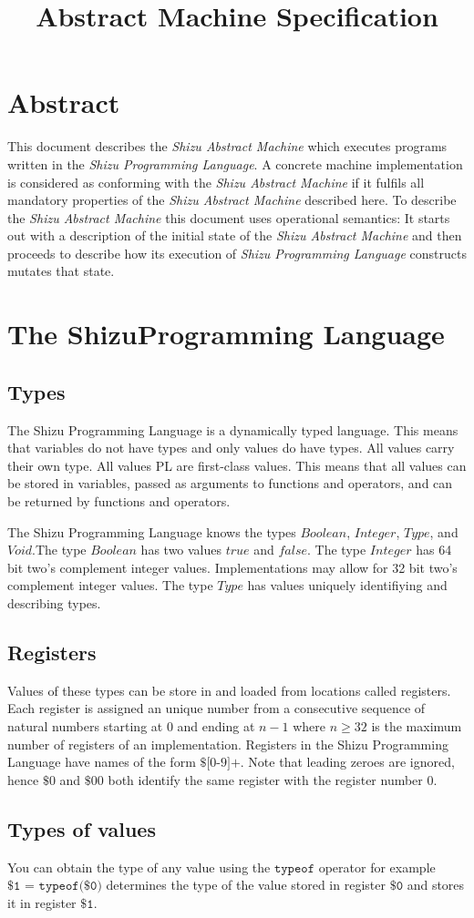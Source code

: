 \documentclass{article}
\title{\myproject{} Abstract Machine Specification}
\author{\myauthor}
\newcommand{\myproject}{Shizu}
\begin{document}
\maketitle
\section{Abstract}
This document describes the \emph{\myproject{} Abstract Machine} which executes programs written in the \emph{\myproject
{} Programming Language}. A concrete machine implementation is considered as conforming with the \emph{\myproject{}
Abstract Machine} if it fulfils all mandatory properties of the \emph{\myproject{} Abstract Machine} described here. To
describe the \emph{\myproject{} Abstract Machine} this document uses operational semantics: It starts out with a
description of the initial state of the \emph{\myproject{} Abstract Machine} and then proceeds to describe how its
execution of \emph{\myproject{} Programming Language} constructs mutates that state.

\section{The \myproject Programming Language}

\subsection{Types}
The \myproject{} Programming Language is a dynamically typed language. This means that variables do not have types and
only values do have types. All values carry their own type. All values PL are first-class values. This means that
all values can be stored in variables, passed as arguments to functions and operators, and can be returned by functions
and operators.

The \myproject{} Programming Language knows the types $\textit{Boolean}$, $\textit{Integer}$, $\textit{Type}$, and
$\textit{Void}$.The type $\textit{Boolean}$ has two values $\textit{true}$ and $\textit{false}$. The type
$\textit{Integer}$ has 64 bit two's complement integer values. Implementations may allow for 32 bit two's complement
integer values. The type $\textit{Type}$ has values uniquely identifiying and describing types.

\subsection{Registers}
Values of these types can be store in and loaded from locations called registers. Each register is assigned an unique
number from a consecutive sequence of natural numbers starting at $0$ and ending at $n-1$ where $n \geq 32$ is the
maximum number of registers of an implementation. Registers in the \myproject{} Programming Language have names of the
form $\textit{\$[0-9]+}$. Note that leading zeroes are ignored, hence $\$0$ and $\$00$ both identify the same register
with the register number $0$.

\subsection{Types of values}
You can obtain the type of any value using the $\texttt{typeof}$ operator for example $\texttt{\$1 = typeof(\$0)}$
determines the type of the value stored in register $\texttt{\$0}$ and stores it in register $\texttt{\$1}$.
\end{document}
